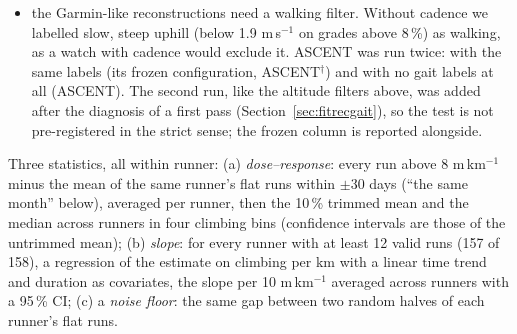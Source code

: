 \documentclass[11pt,a4paper]{article}
\newcommand{\ascent}{ASCENT}
\begin{document}
\begin{itemize}[leftmargin=*]
\item the Garmin-like reconstructions need a walking filter. Without cadence we labelled slow, steep uphill (below 1.9 m\,s$^{-1}$ on grades above 8\,\%) as walking, as a watch with cadence would exclude it. \ascent{} was run twice: with the same labels (its frozen configuration, \ascent$^{\dagger}$) and with no gait labels at all (\ascent). The second run, like the altitude filters above, was added after the diagnosis of a first pass (Section~\ref{sec:fitrecgait}), so the test is not pre-registered in the strict sense; the frozen column is reported alongside.
\end{itemize}
Three statistics, all within runner: (a) \emph{dose--response}: every run above 8 m\,km$^{-1}$ minus the mean of the same runner's flat runs within $\pm30$ days (``the same month'' below), averaged per runner, then the 10\,\% trimmed mean and the median across runners in four climbing bins (confidence intervals are those of the untrimmed mean); (b) \emph{slope}: for every runner with at least 12 valid runs (157 of 158), a regression of the estimate on climbing per km with a linear time trend and duration as covariates, the slope per 10 m\,km$^{-1}$ averaged across runners with a 95\,\% CI; (c) a \emph{noise floor}: the same gap between two random halves of each runner's flat runs.
\end{document}
